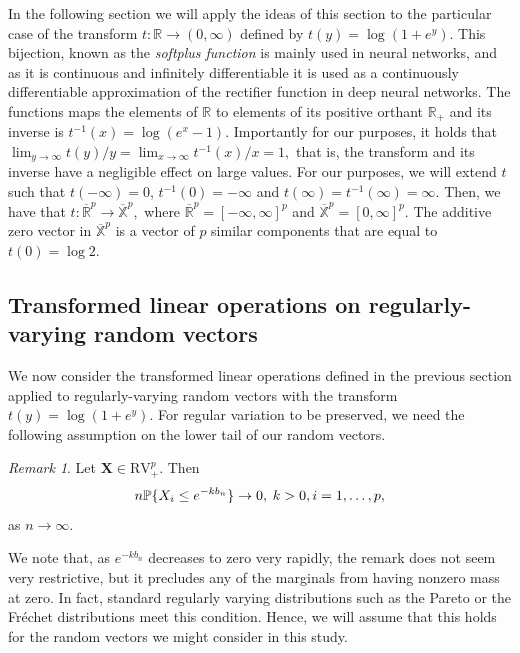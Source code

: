 \documentclass[11pt, oneside]{book}
\theoremstyle{plain}
\theoremstyle{remark}
\newtheorem*{rem}{Remark}
\begin{document}
In the following section we will apply the ideas of this section to the
particular case of the transform $t:\mathbb{R}\to(0,\infty)$ defined by $t(y) =
\log(1+e^{y}).$ This bijection, known as the \emph{softplus function} is mainly
used in neural networks, and as it is continuous and infinitely differentiable
it is used as a continuously differentiable approximation of the rectifier
function in deep neural networks. The functions maps the elements of
$\mathbb{R}$ to elements of its positive orthant $\mathbb{R}_+$ and its inverse
is $t^{-1}(x)=\log(e^x-1).$ Importantly for our purposes, it holds that
$\lim_{y\to\infty}t(y)/y = \lim_{x\to\infty}t^{-1}(x)/x = 1,$ that is, the
transform and its inverse have a negligible effect on large values. For our
purposes, we will extend $t$ such that $t(-\infty)=0$, $t^{-1}(0)=-\infty$ and
$t(\infty)=t^{-1}(\infty)=\infty.$ Then, we have that $t:\overline{\mathbb{R}}^p
\to\overline{\mathbb{X}}^p,$ where $\overline{\mathbb{R}}^p=[-\infty,\infty]^p$
and $\overline{\mathbb{X}}^p=[0,\infty]^p.$ The additive zero vector in
$\overline{\mathbb{X}}^p$ is a vector of $p$ similar components that are equal
to $t(0)=\log 2.$

\subsection{Transformed linear operations on regularly-varying random vectors}
We now consider the transformed linear operations defined in the previous
section applied to regularly-varying random vectors with the transform
$t(y)=\log(1+e^y).$ For regular variation to be preserved, we need the following
assumption on the lower tail of our random vectors.
\begin{rem}
    Let $\mathbf{X}\in\text{RV}^p_+.$ Then 
    \begin{equation}\label{eq:condition-mass}
        n\mathbb{P}\{X_i\leq e^{-kb_n}\}\to 0, \hspace{.25em} k>0,
        i=1,\dots,p,
    \end{equation}
    as $n\to\infty.$
\end{rem}    
We note that, as $e^{-kb_n}$ decreases to zero very rapidly, the remark does not
seem very restrictive, but it precludes any of the marginals from having nonzero
mass at zero. In fact, standard regularly varying distributions such as the
Pareto or the Fréchet distributions meet this condition. Hence, we will assume
that this holds for the random vectors we might consider in this study.
\end{document}
